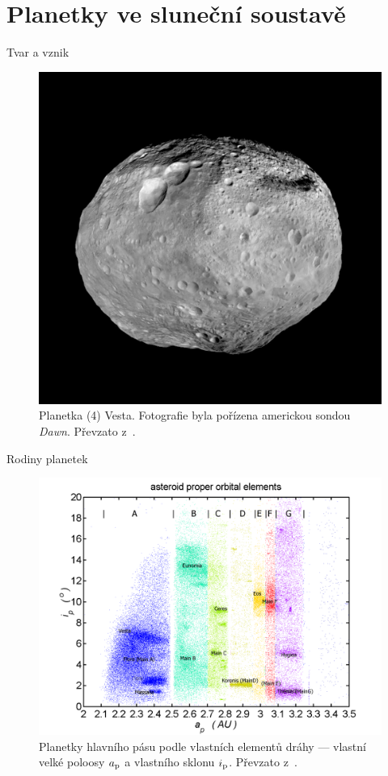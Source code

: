 \documentclass[xcolor=dvipsnames]{beamer}
\begin{document}
\section{Planetky ve sluneční soustavě}
\begin{frame}{\secname}{Tvar a vznik}
\begin{figure}
\centering
\includegraphics[height=0.7\textheight,width=\textwidth,keepaspectratio]{../obr/vesta.jpg}
\caption{\footnotesize{Planetka (4) Vesta. Fotografie byla pořízena americkou sondou \textit{Dawn}. Převzato z~\cite{jplvesta}.}}
\end{figure}
\end{frame}

\begin{frame}{\secname}{Rodiny planetek}
\begin{figure}
\centering
\includegraphics[height=0.7\textheight,width=\textwidth,keepaspectratio]{../obr/mainbelt.png}
\caption{\footnotesize{Planetky hlavního pásu podle vlastních elementů dráhy --- vlastní velké poloosy $a_{\rm p}$ a vlastního sklonu $i_{\rm p}$. Převzato z~\cite{wiki:belt}.}}
\end{figure}
\end{frame}
\end{document}
